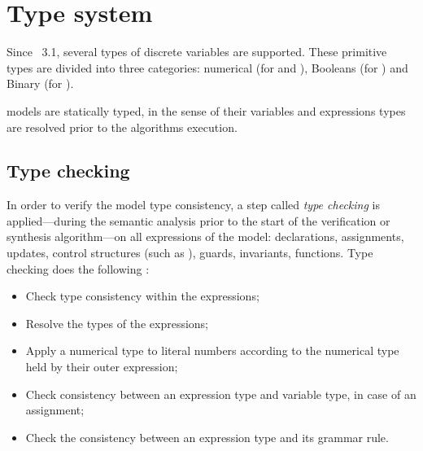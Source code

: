 \section{Type system}\label{section:type_system}

Since \imitator{}~3.1, several types of discrete variables are supported.
%
These primitive types are divided into three categories: numerical (for  and ), Booleans (for ) and Binary (for ).

\imitator{} models are statically typed, in the sense of their variables and expressions types are resolved prior to the algorithms execution.


\subsection{Type checking}

In order to verify the model type consistency, a step called \emph{type checking} is applied---during the semantic analysis prior to the start of the verification or synthesis algorithm---on all expressions of the model: declarations, assignments, updates, control structures (such as ), guards, invariants, functions.
Type checking does the following :

\begin{itemize}
	\item Check type consistency within the expressions;
	\item Resolve the types of the expressions;
	\item Apply a numerical type to literal numbers according to the numerical type held by their outer expression;
	\item Check consistency between an expression type and variable type, in case of an assignment;
	\item Check the consistency between an expression type and its grammar rule.
\end{itemize}

